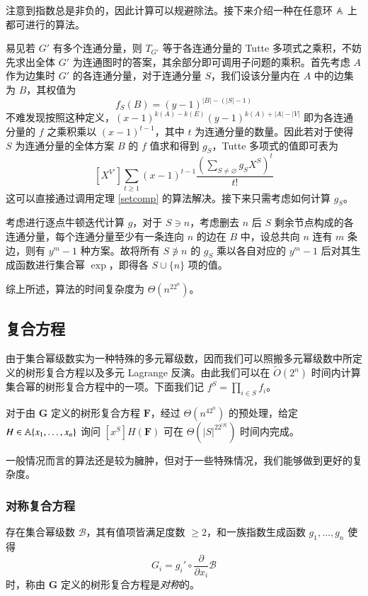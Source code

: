 注意到指数总是非负的，因此计算可以规避除法。接下来介绍一种在任意环 $\mathbb A$ 上都可进行的算法。

易见若 $G'$ 有多个连通分量，则 $T_{G'}$ 等于各连通分量的 Tutte 多项式之乘积，不妨先求出全体 $G'$ 为连通图时的答案，其余部分即可调用子问题的乘积。首先考虑 $A$ 作为边集时 $G'$ 的各连通分量，对于连通分量 $S$，我们设该分量内在 $A$ 中的边集为 $B$，其权值为
$$
f_S(B)=(y-1)^{|B|-(|S|-1)}
$$
不难发现按照这种定义，$(x-1)^{k(A)-k(E)}(y-1)^{k(A)+|A|-|V|}$ 即为各连通分量的 $f$ 之乘积乘以 $(x-1)^{t-1}$，其中 $t$ 为连通分量的数量。因此若对于使得 $S$ 为连通分量的全体方案 $B$ 的 $f$ 值求和得到 $g_S$，Tutte 多项式的值即可表为
$$
[X^{V'}] \sum_{t\ge 1} (x-1)^{t-1}\frac{\left( \sum_{S\neq \varnothing} g_S X^S \right)^t}{t!}
$$
这可以直接通过调用定理 \ref{setcomp} 的算法解决。接下来只需考虑如何计算 $g_S$。

考虑进行逐点牛顿迭代计算 $g$，对于 $S\ni n$，考虑删去 $n$ 后 $S$ 剩余节点构成的各连通分量，每个连通分量至少有一条连向 $n$ 的边在 $B$ 中，设总共向 $n$ 连有 $m$ 条边，则有 $y^m-1$ 种方案。故将所有 $S\not \ni n$ 的 $g_S$ 乘以各自对应的 $y^m-1$ 后对其生成函数进行集合幂 $\exp$，即得各 $S\cup \{n\}$ 项的值。

综上所述，算法的时间复杂度为 $\Theta(n^22^n)$。

\subsection{复合方程}

由于集合幂级数实为一种特殊的多元幂级数，因而我们可以照搬多元幂级数中所定义的树形复合方程以及多元 Lagrange 反演。由此我们可以在 $\tilde O(2^n)$ 时间内计算集合幂的树形复合方程中的一项。下面我们记 $f^S = \prod_{i\in S} f_i$。

\begin{theorem} \label{algocomp}
对于由 $\mathbf G$ 定义的树形复合方程 $\mathbf F$，经过 $\Theta(n^42^n)$ 的预处理，给定 $H \in \mathbb A\{x_1,\dots,x_n\}$ 询问 $[x^S] H(\mathbf F)$ 可在 $\Theta(|S|^22^{|S|})$ 时间内完成。
\end{theorem}

一般情况而言的算法还是较为臃肿，但对于一些特殊情况，我们能够做到更好的复杂度。

\subsubsection{对称复合方程}

\begin{definition}[对称复合方程]
存在集合幂级数 $\mathscr B$，其有值项皆满足度数 $\ge 2$，和一族指数生成函数 $g_1,\dots,g_n$ 使得
$$
G_i=g_i'\circ \frac{\partial}{\partial x_i} \mathscr B
$$
时，称由 $\mathbf G$ 定义的树形复合方程是\emph{对称}的。
\end{definition}

